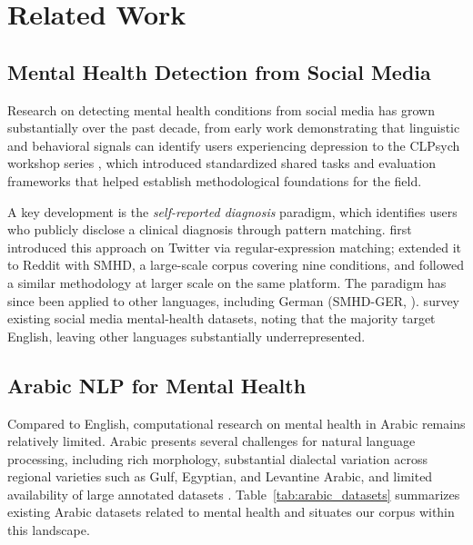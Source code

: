 \documentclass[11pt]{article}
\begin{document}
\section{Related Work}
\label{sec:related_work}

\subsection{Mental Health Detection from Social Media}
\label{subsec:related_social_media}
Research on detecting mental health conditions from social media has grown substantially over the past decade, from early work demonstrating that linguistic and behavioral signals can identify users experiencing depression \citep{de2013predicting} to the CLPsych workshop series \citep{coppersmith2015clpsych}, which introduced standardized shared tasks and evaluation frameworks that helped establish methodological foundations for the field.

A key development is the \textit{self-reported diagnosis} paradigm, which identifies users who publicly disclose a clinical diagnosis through pattern matching. \citet{coppersmith2014quantifying} first introduced this approach on Twitter via regular-expression matching; \citet{cohan-etal-2018-smhd} extended it to Reddit with SMHD, a large-scale corpus covering nine conditions, and \citet{mankarious2025mindset} followed a similar methodology at larger scale on the same platform. The paradigm has since been applied to other languages, including German (SMHD-GER, \citealp{zanwar2023smhd}). \citet{harrigian2021state} survey existing social media mental-health datasets, noting that the majority target English, leaving other languages substantially underrepresented.

\subsection{Arabic NLP for Mental Health}
\label{subsec:related_arabic}

Compared to English, computational research on mental health in Arabic remains
relatively limited. Arabic presents several challenges for natural language
processing, including rich morphology, substantial dialectal variation across
regional varieties such as Gulf, Egyptian, and Levantine Arabic, and limited
availability of large annotated datasets \cite{darwish2021panoramic, alayba2025arabic}.
Table~\ref{tab:arabic_datasets} summarizes existing Arabic datasets related to
mental health and situates our corpus within this landscape.
\end{document}
